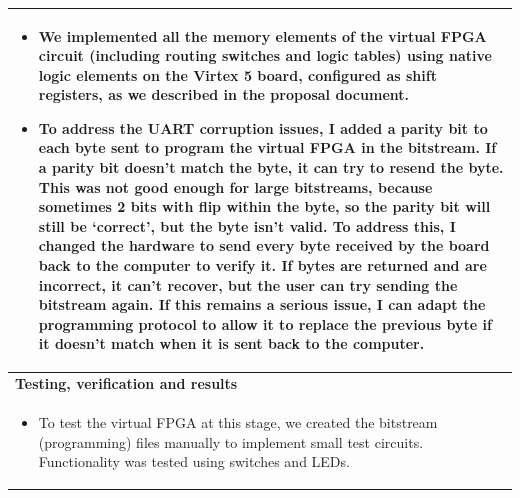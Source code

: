 \documentclass[12pt,letterpaper]{article}
\begin{document}
\begin{tabular}{|p{6.4in}|}
\begin{itemize}
\item We implemented all the memory elements of the virtual FPGA circuit (including routing switches and logic tables) using native logic elements on the Virtex 5 board, configured as shift registers, as we described in the proposal document.
\item To address the UART corruption issues, I added a parity bit to each byte sent to program the virtual FPGA in the bitstream. If a parity bit doesn't match the byte, it can try to resend the byte. This was not good enough for large bitstreams, because sometimes 2 bits with flip within the byte, so the parity bit will still be `correct', but the byte isn't valid. To address this, I changed the hardware to send every byte received by the board back to the computer to verify it. If bytes are returned and are incorrect, it can't recover, but the user can try sending the bitstream again. If this remains a serious issue, I can adapt the programming protocol to allow it to replace the previous byte if it doesn't match when it is sent back to the computer.
\end{itemize} 
\vspace{-1em} \\
\hline
\textbf{Testing, verification and results} \\
\vspace{-1em}
\begin{itemize}
\item To test the virtual FPGA at this stage, we created the bitstream (programming) files manually to implement small test circuits. Functionality was tested using switches and LEDs.
\end{itemize} 
\vspace{-1em} \\
\hline
\end{tabular}
\end{document}
